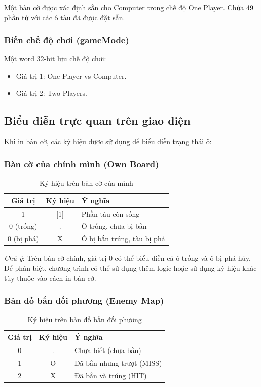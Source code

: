 Một bàn cờ được xác định sẵn cho Computer trong chế độ One Player. Chứa 49 phần tử với các ô tàu đã được đặt sẵn.

\subsubsection{Biến chế độ chơi (gameMode)}

Một word 32-bit lưu chế độ chơi:
\begin{itemize}
    \item Giá trị 1: One Player vs Computer.
    \item Giá trị 2: Two Players.
\end{itemize}

\subsection{Biểu diễn trực quan trên giao diện}

Khi in bàn cờ, các ký hiệu được sử dụng để biểu diễn trạng thái ô:

\subsubsection{Bàn cờ của chính mình (Own Board)}

\begin{table}[H]
\centering
\begin{tabular}{|c|c|l|}
\hline
\textbf{Giá trị} & \textbf{Ký hiệu} & \textbf{Ý nghĩa} \\
\hline
1 & [1] & Phần tàu còn sống \\
\hline
0 (trống) & . & Ô trống, chưa bị bắn \\
\hline
0 (bị phá) & X & Ô bị bắn trúng, tàu bị phá \\
\hline
\end{tabular}
\caption{Ký hiệu trên bàn cờ của mình}
\end{table}

\textit{Chú ý}: Trên bàn cờ chính, giá trị 0 có thể biểu diễn cả ô trống và ô bị phá hủy. Để phân biệt, chương trình có thể sử dụng thêm logic hoặc sử dụng ký hiệu khác tùy thuộc vào cách in bàn cờ.

\subsubsection{Bản đồ bắn đối phương (Enemy Map)}

\begin{table}[H]
\centering
\begin{tabular}{|c|c|l|}
\hline
\textbf{Giá trị} & \textbf{Ký hiệu} & \textbf{Ý nghĩa} \\
\hline
0 & . & Chưa biết (chưa bắn) \\
\hline
1 & O & Đã bắn nhưng trượt (MISS) \\
\hline
2 & X & Đã bắn và trúng (HIT) \\
\hline
\end{tabular}
\caption{Ký hiệu trên bản đồ bắn đối phương}
\end{table}

